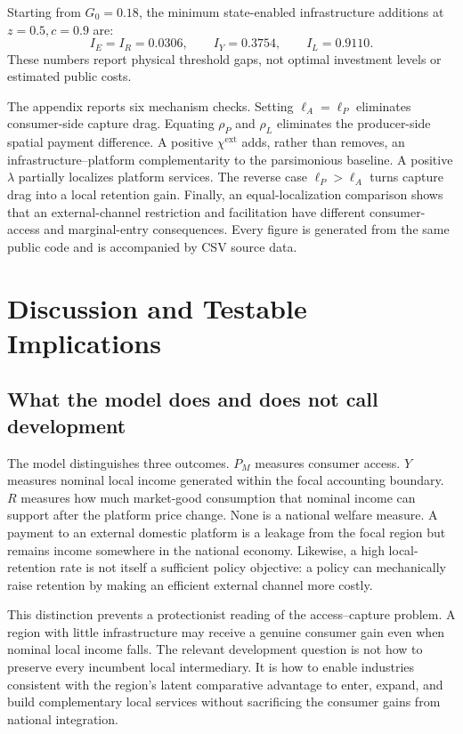 \documentclass[11pt]{article}
\theoremstyle{definition}
\theoremstyle{remark}
\begin{document}
Starting from \(G_0=0.18\), the minimum state-enabled infrastructure additions
at \(z=0.5,c=0.9\) are:
\[
I_E=I_R=0.0306,\qquad
I_Y=0.3754,\qquad
I_L=0.9110.
\]
These numbers report physical threshold gaps, not optimal investment levels or
estimated public costs.

The appendix reports six mechanism checks.  Setting
\(\ell_A=\ell_P\) eliminates consumer-side capture drag.  Equating
\(\rho_P\) and \(\rho_L\) eliminates the producer-side spatial payment
difference.  A positive \(\chi^{\mathrm{ext}}\) adds, rather than removes, an
infrastructure--platform complementarity to the parsimonious baseline.  A
positive \(\lambda\) partially localizes platform services.  The reverse case
\(\ell_P>\ell_A\) turns capture drag into a local retention gain.  Finally, an
equal-localization comparison shows that an external-channel restriction and
facilitation have different consumer-access and marginal-entry consequences.
Every figure is generated from the same public code and is accompanied by CSV
source data.

\section{Discussion and Testable Implications}

\subsection{What the model does and does not call development}

The model distinguishes three outcomes.  \(P_M\) measures consumer access.
\(Y\) measures nominal local income generated within the focal accounting
boundary.  \(R\) measures how much market-good consumption that nominal
income can support after the platform price change.  None is a national
welfare measure.  A payment to an external domestic platform is a leakage
from the focal region but remains income somewhere in the national economy.
Likewise, a high local-retention rate is not itself a sufficient policy
objective: a policy can mechanically raise retention by making an efficient
external channel more costly.

This distinction prevents a protectionist reading of the access--capture
problem.  A region with little infrastructure may receive a genuine consumer gain
even when nominal local income falls.  The relevant development question is
not how to preserve every incumbent local intermediary.  It is how to enable
industries consistent with the region's latent comparative advantage to
enter, expand, and build complementary local services without sacrificing the
consumer gains from national integration.
\end{document}
